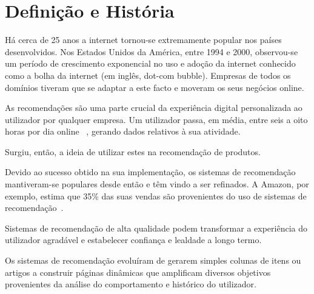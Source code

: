 \section{Definição e História}
\hfill

\par Há cerca de 25 anos a internet tornou-se extremamente popular nos países desenvolvidos. Nos Estados Unidos da América, entre 1994 e 2000, observou-se um período de crescimento exponencial no uso e adoção da internet conhecido como a bolha da internet (em inglês, dot-com bubble). Empresas de todos os domínios tiveram que se adaptar a este facto e moveram os seus negócios online. 

\par As recomendações são uma parte crucial da experiência digital personalizada ao utilizador por qualquer empresa. Um utilizador passa, em média, entre seis a oito horas por dia online ~\cite{ref_history1}, gerando dados relativos à sua atividade. 

\par Surgiu, então, a ideia de utilizar estes na recomendação de produtos. 

\par Devido ao sucesso obtido na sua implementação, os sistemas de recomendação mantiveram-se populares desde então e têm vindo a ser refinados. A Amazon, por exemplo, estima que 35\% das suas vendas são provenientes do uso de sistemas de recomendação~\cite{ref_history2}. 

\par Sistemas de recomendação de alta qualidade podem transformar a experiência do utilizador agradável e estabelecer confiança e lealdade a longo termo. 

\par Os sistemas de recomendação evoluíram de gerarem simples colunas de itens ou artigos a construir páginas dinâmicas que amplificam diversos objetivos provenientes da análise do comportamento e histórico do utilizador. 
